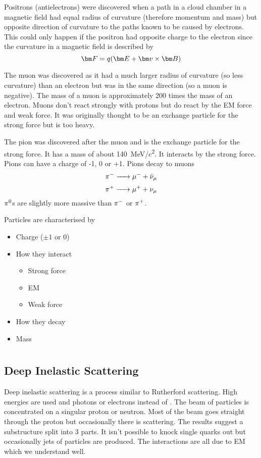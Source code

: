 Positrons (antielectrons) were discovered when a path in a cloud chamber in a magnetic field had equal radius of curvature (therefore momentum and mass) but opposite direction of curvature to the paths known to be caused by electrons. This could only happen if the positron had opposite charge to the electron since the curvature in a magnetic field is described by
\[\vv F=q(\vv E+\vv v\times\vv B)\]

The muon was discovered as it had a much larger radius of curvature (so less curvature) than an electron but was in the same direction (so a muon is negative). The mass of a muon is approximately 200 times the mass of an electron. Muons don't react strongly with protons but do react by the EM force and weak force. It was originally thought to be an exchange particle for the strong force but is too heavy.

The pion was discovered after the muon and is the exchange particle for the strong force. It has a mass of about \SI{140}{MeV/c^2}. It interacts by the strong force. Pions can have a charge of -1, 0 or +1. Pions decay to muons
\[\piminus\ce{->}\muonm+\antineutrino[\mu]\]
\[\piplus\ce{->}\muonp+\neutrino[\mu]\]
\(\pi^0\)s are slightly more massive than \(\pi^-\) or \(\pi^+\).

Particles are characterised by
\begin{itemize}
\item Charge (\(\pm 1\) or 0)
\item How they interact
\begin{itemize}
\item Strong force
\item EM
\item Weak force
\end{itemize}
\item How they decay
\item Mass
\end{itemize}

\section{}

\subsection*{Deep Inelastic Scattering}

Deep inelastic scattering is a process similar to Rutherford scattering. High energies are used and photons or electrons instead of \aparticles. The beam of particles is concentrated on a singular proton or neutron. Most of the beam goes straight through the proton but occasionally there is scattering. The results suggest a substructure split into 3 parts. It isn't possible to knock single quarks out but occasionally jets of particles are produced. The interactions are all due to EM which we understand well.

